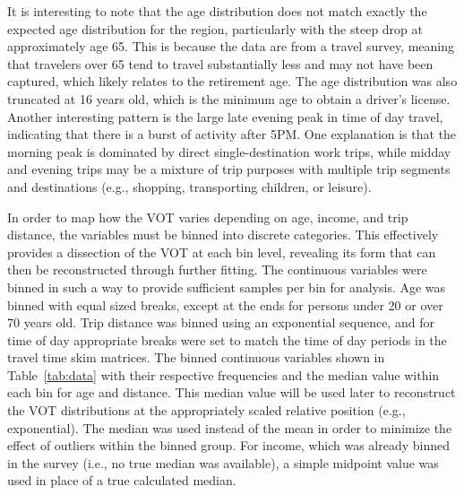 \documentclass[numbered]{trbunofficial}\usepackage[]{graphicx}\usepackage[]{color}
\begin{document}
It is interesting to note that the age distribution does not match exactly the expected age distribution for the region, particularly with the steep drop at approximately age 65. This is because the data are from a travel survey, meaning that travelers over 65 tend to travel substantially less and may not have been captured, which likely relates to the retirement age. The age distribution was also truncated at 16 years old, which is the minimum age to obtain a driver's license. Another interesting pattern is the large late evening peak in time of day travel, indicating that there is a burst of activity after 5PM. One explanation is that the morning peak is dominated by direct single-destination work trips, while midday and evening trips may be a mixture of trip purposes with multiple trip segments and destinations (e.g., shopping, transporting children, or leisure). 

In order to map how the VOT varies depending on age, income, and trip distance, the variables must be binned into discrete categories. This effectively provides a dissection of the VOT at each bin level, revealing its form that can then be reconstructed through further fitting. The continuous variables were binned in such a way to provide sufficient samples per bin for analysis. Age was binned with equal sized breaks, except at the ends for persons under 20 or over 70 years old. Trip distance was binned using an exponential sequence, and for time of day appropriate breaks were set to match the time of day periods in the travel time skim matrices. The binned continuous variables shown in Table~\ref{tab:data} with their respective frequencies and the median value within each bin for age and distance. This median value will be used later to reconstruct the VOT distributions at the appropriately scaled relative position (e.g., exponential). The median was used instead of the mean in order to minimize the effect of outliers within the binned group. For income, which was already binned in the survey (i.e., no true median was available), a simple midpoint value was used in place of a true calculated median.

\end{document}
